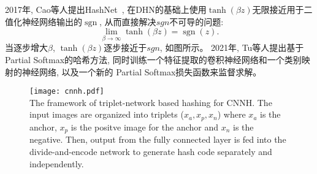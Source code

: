 2017年, Cao等人提出HashNet~\cite{cao2017hashnet},  在DHN的基础上使用$\operatorname{tanh}(\beta z)$无限接近用于二值化神经网络输出的$\operatorname{sgn}$, 从而直接解决$sgn$不可导的问题:
\begin{equation}
    \lim _{\beta \rightarrow \infty} \tanh (\beta z)=\operatorname{sgn}(z).
\end{equation}
当逐步增大$\beta$, $\operatorname{tanh}(\beta z)$逐步接近于$sgn$, 如图所示。
2021年, Tu等人提出基于Partial Softmax的哈希方法, 同时训练一个特征提取的卷积神经网络和一个类别映射的神经网络, 以及一个新的 Partial Softmax损失函数来监督求解。
\begin{figure}[!htp]
    \centering
    \texttt{[image: cnnh.pdf]} \\
      {The framework of triplet-network based hashing for CNNH. The input images are organized into triplets ($x_a, x_p, x_n$) where $x_a$ is the anchor, $x_p$ is the positve image for the anchor and $x_n$ is the negative. Then, output from the fully connected layer  is fed into the divide-and-encode network to generate hash code separately and independently.}
   \label{fig:trihash}
\end{figure}
